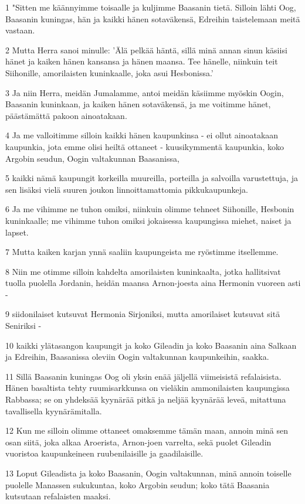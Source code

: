 \par 1 "Sitten me käännyimme toisaalle ja kuljimme Baasanin tietä. Silloin lähti Oog, Baasanin kuningas, hän ja kaikki hänen sotaväkensä, Edreihin taistelemaan meitä vastaan.
\par 2 Mutta Herra sanoi minulle: 'Älä pelkää häntä, sillä minä annan sinun käsiisi hänet ja kaiken hänen kansansa ja hänen maansa. Tee hänelle, niinkuin teit Siihonille, amorilaisten kuninkaalle, joka asui Hesbonissa.'
\par 3 Ja niin Herra, meidän Jumalamme, antoi meidän käsiimme myöskin Oogin, Baasanin kuninkaan, ja kaiken hänen sotaväkensä, ja me voitimme hänet, päästämättä pakoon ainoatakaan.
\par 4 Ja me valloitimme silloin kaikki hänen kaupunkinsa - ei ollut ainoatakaan kaupunkia, jota emme olisi heiltä ottaneet - kuusikymmentä kaupunkia, koko Argobin seudun, Oogin valtakunnan Baasanissa,
\par 5 kaikki nämä kaupungit korkeilla muureilla, porteilla ja salvoilla varustettuja, ja sen lisäksi vielä suuren joukon linnoittamattomia pikkukaupunkeja.
\par 6 Ja me vihimme ne tuhon omiksi, niinkuin olimme tehneet Siihonille, Hesbonin kuninkaalle; me vihimme tuhon omiksi jokaisessa kaupungissa miehet, naiset ja lapset.
\par 7 Mutta kaiken karjan ynnä saaliin kaupungeista me ryöstimme itsellemme.
\par 8 Niin me otimme silloin kahdelta amorilaisten kuninkaalta, jotka hallitsivat tuolla puolella Jordanin, heidän maansa Arnon-joesta aina Hermonin vuoreen asti -
\par 9 siidonilaiset kutsuvat Hermonia Sirjoniksi, mutta amorilaiset kutsuvat sitä Seniriksi -
\par 10 kaikki ylätasangon kaupungit ja koko Gileadin ja koko Baasanin aina Salkaan ja Edreihin, Baasanissa oleviin Oogin valtakunnan kaupunkeihin, saakka.
\par 11 Sillä Baasanin kuningas Oog oli yksin enää jäljellä viimeisistä refalaisista. Hänen basaltista tehty ruumisarkkunsa on vieläkin ammonilaisten kaupungissa Rabbassa; se on yhdeksää kyynärää pitkä ja neljää kyynärää leveä, mitattuna tavallisella kyynärämitalla.
\par 12 Kun me silloin olimme ottaneet omaksemme tämän maan, annoin minä sen osan siitä, joka alkaa Aroerista, Arnon-joen varrelta, sekä puolet Gileadin vuoristoa kaupunkeineen ruubenilaisille ja gaadilaisille.
\par 13 Loput Gileadista ja koko Baasanin, Oogin valtakunnan, minä annoin toiselle puolelle Manassen sukukuntaa, koko Argobin seudun; koko tätä Baasania kutsutaan refalaisten maaksi.
